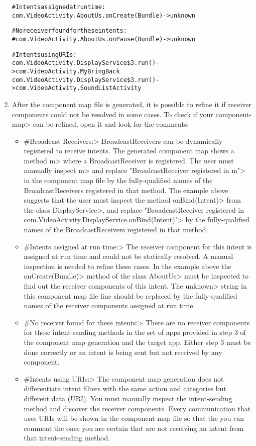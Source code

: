 \begin{enumerate}
\begin{alltt}
#Intents assigned at run time:
com.VideoActivity.AboutUs.onCreate(Bundle) -> unknown

#No receiver found for these intents:
#com.VideoActivity.AboutUs.onPause(Bundle) -> unknown

#Intents using URIs:
com.VideoActivity.DisplayService\$3.run() -> com.VideoActivity.MyBringBack
com.VideoActivity.DisplayService\$3.run() -> com.VideoActivity.SoundListActivity

\end{alltt}
\item
After the component map file is generated, it is possible to refine it if
receiver components could not be resolved in some cases. To check if your
\<component-map> can be refined, open it and look for the comments:
\begin{itemize}
\item
\<\#Broadcast Receivers:> BroadcastReceivers can be dynamically registered to
receive intents. The generated component map shows a method \<m> where a
BroadcastReceiver is registered. The user must manually inspect \<m> and replace
\<"BroadcastReceiver registered in m"> in the component map file by the
fully-qualified names of the BroadcastReceivers
registered in that method. The example above suggests that the user must inspect
the method \<onBind(Intent)> from the class \<DisplayService>, and replace
\<"BroadcastReceiver registered in
com.VideoActivity.DisplayService.onBind(Intent)"> by the fully-qualified names of
the BroadcastReceivers registered in that method.
\item
\<\#Intents assigned at run time:> The receiver component for this intent is
assigned at run time and could not be statically resolved. A manual inspection
is needed to refine these cases. In the example above the \<onCreate(Bundle)>
method of the class \<AboutUs> must be inspected to find out the receiver
components of this intent. The \<unknown> string in this component map file line
should be replaced by the fully-qualified names of the receiver components
assigned at run time.
\item
\<\#No receiver found for these intents:> There are no receiver components for
these intent-sending methods in the set of apps provided in step 3 of the
component map generation and the target app. Either step 3 must be done
correctly or an intent is being sent but not received by any component.
\item
\<\#Intents using URIs:> The component map generation does not differentiate
intent filters with the same action and categories but different data (URI).
You must manually inspect the intent-sending method and discover the receiver
components. Every communication that uses URIs will be shown in the component
map file so that the you can comment the ones you are certain that are not
receiving an intent from that intent-sending method.
\end{itemize}
\end{enumerate}

